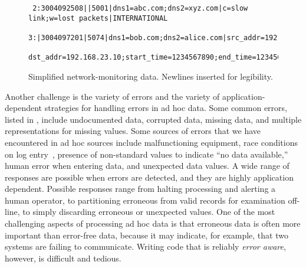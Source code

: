 \begin{figure}
  \centering
  \small
\begin{verbatim}
 2:3004092508||5001|dns1=abc.com;dns2=xyz.com|c=slow link;w=lost packets|INTERNATIONAL
 3:|3004097201|5074|dns1=bob.com;dns2=alice.com|src_addr=192.168.0.10;
 dst_addr=192.168.23.10;start_time=1234567890;end_time=1234568000;cycle_time=17412|SPECIAL
\end{verbatim}  
  \caption{Simplified network-monitoring data. Newlines 
inserted for legibility.}
  \label{fig:darkstar-records1}
\end{figure}



Another challenge is the variety of errors and the
variety of application-dependent strategies for handling errors in ad
hoc data.  Some common errors, listed in ,
include undocumented data, corrupted data, missing data, and multiple
representations for missing values.  Some sources of errors
that we have encountered in ad hoc sources include malfunctioning
equipment, race conditions on log entry~\cite{wpp}, presence of
non-standard values to indicate ``no data available,'' human error
when entering data, and unexpected data values.  A wide range of
responses are possible when errors are detected, and they are highly
application dependent.  Possible responses range from halting processing
and alerting a human operator, to partitioning erroneous from valid
records for examination off-line, to simply discarding erroneous or
unexpected values.  One of the most challenging aspects of processing
ad hoc data is that erroneous data is often more important than
error-free data, because it may indicate, for example, that two
systems are failing to communicate.  Writing code that is reliably
\emph{error aware}, however, is difficult and tedious.

